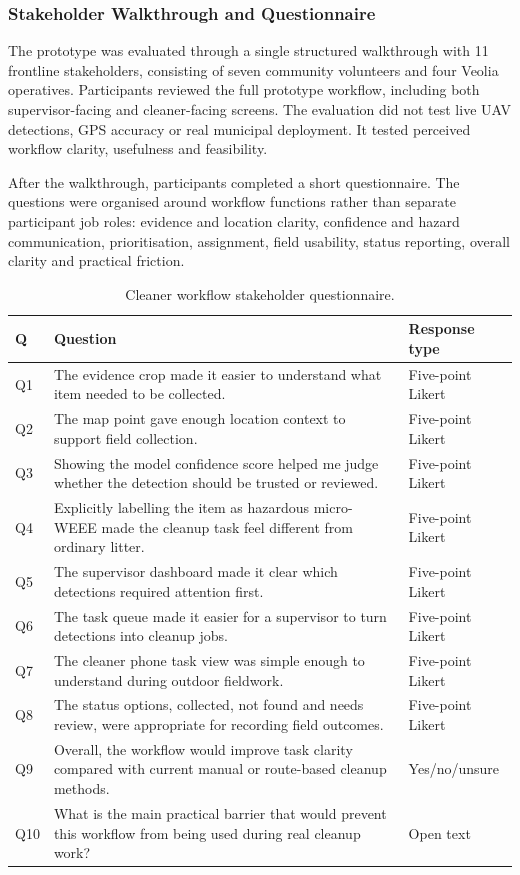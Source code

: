 \subsubsection{Stakeholder Walkthrough and Questionnaire}

The prototype was evaluated through a single structured walkthrough with 11 frontline stakeholders, consisting of seven community volunteers and four Veolia operatives. Participants reviewed the full prototype workflow, including both supervisor-facing and cleaner-facing screens. The evaluation did not test live UAV detections, GPS accuracy or real municipal deployment. It tested perceived workflow clarity, usefulness and feasibility.

After the walkthrough, participants completed a short questionnaire. The questions were organised around workflow functions rather than separate participant job roles: evidence and location clarity, confidence and hazard communication, prioritisation, assignment, field usability, status reporting, overall clarity and practical friction.

\begin{table}[H]
\centering
\small
\begin{tabularx}{\textwidth}{p{} X p{}}
\toprule
\textbf{Q} & \textbf{Question} & \textbf{Response type} \\
\midrule
Q1 & The evidence crop made it easier to understand what item needed to be collected. & Five-point Likert \\
Q2 & The map point gave enough location context to support field collection. & Five-point Likert \\
Q3 & Showing the model confidence score helped me judge whether the detection should be trusted or reviewed. & Five-point Likert \\
Q4 & Explicitly labelling the item as hazardous micro-WEEE made the cleanup task feel different from ordinary litter. & Five-point Likert \\
Q5 & The supervisor dashboard made it clear which detections required attention first. & Five-point Likert \\
Q6 & The task queue made it easier for a supervisor to turn detections into cleanup jobs. & Five-point Likert \\
Q7 & The cleaner phone task view was simple enough to understand during outdoor fieldwork. & Five-point Likert \\
Q8 & The status options, collected, not found and needs review, were appropriate for recording field outcomes. & Five-point Likert \\
Q9 & Overall, the workflow would improve task clarity compared with current manual or route-based cleanup methods. & Yes/no/unsure \\
Q10 & What is the main practical barrier that would prevent this workflow from being used during real cleanup work? & Open text \\
\bottomrule
\end{tabularx}
\caption{Cleaner workflow stakeholder questionnaire.}
\label{tab:cleaner_method_survey}
\end{table}

